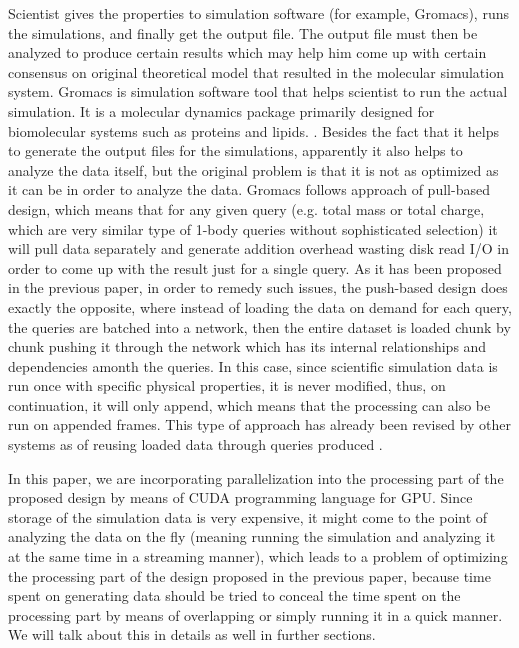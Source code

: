 \documentclass[12pt,letterpaper]{report}
\begin{document}
Scientist gives the properties to simulation software (for example, Gromacs), runs the simulations, and finally get the output file. The output file must then be analyzed to produce certain results which may help him come up with certain consensus on original theoretical model that resulted in the molecular simulation system\cite{Frenkel:api01}. Gromacs is simulation software tool that helps scientist to run the actual simulation. It is a molecular dynamics package primarily designed for biomolecular systems such as proteins and lipids. \cite{Gromacs-online}. Besides the fact that it helps to generate the output files for the simulations, apparently it also helps to analyze the data itself, but the original problem is that it is not as optimized as it can be in order to analyze the data. Gromacs follows approach of pull-based design, which means that for any given query (e.g. total mass or total charge, which are very similar type of 1-body queries without sophisticated selection) it will pull data separately and generate addition overhead wasting disk read I/O in order to come up with the result just for a single query. As it has been proposed in the previous paper, in order to remedy such issues, the push-based design does exactly the opposite, where instead of loading the data on demand for each query, the queries are batched into a network, then the entire dataset is loaded chunk by chunk pushing it through the network which has its internal relationships and dependencies amonth the queries. In this case, since scientific simulation data is run once with specific physical properties, it is never modified, thus, on continuation, it will only append, which means that the processing can also be run on appended frames. \cite{mainPaper}
This type of approach has already been revised by other systems \cite {DataPath,Volcano,Qpipe} as of reusing loaded data through queries produced \cite {Candea,PredictablePerformance,CooperativeScans}.

In this paper, we are incorporating parallelization into the processing part of the proposed design by means of CUDA programming language for GPU. Since storage of the simulation data is very expensive, it might come to the point of analyzing the data on the fly (meaning running the simulation and analyzing it at the same time in a streaming manner), which leads to a problem of optimizing the processing part of the design proposed in the previous paper, because time spent on generating data should be tried to conceal the time spent on the processing part by means of overlapping or simply running it in a quick manner. We will talk about this in details as well in further sections.
\end{document}
